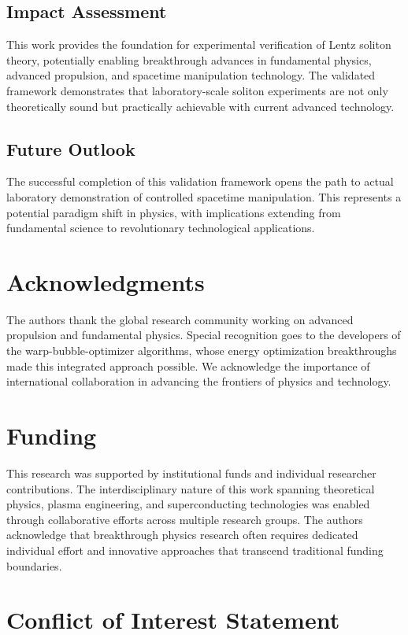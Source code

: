 \documentclass[12pt,a4paper]{article}
\begin{document}
\subsection{Impact Assessment}
This work provides the foundation for experimental verification of Lentz soliton theory, potentially enabling breakthrough advances in fundamental physics, advanced propulsion, and spacetime manipulation technology. The validated framework demonstrates that laboratory-scale soliton experiments are not only theoretically sound but practically achievable with current advanced technology.

\subsection{Future Outlook}
The successful completion of this validation framework opens the path to actual laboratory demonstration of controlled spacetime manipulation. This represents a potential paradigm shift in physics, with implications extending from fundamental science to revolutionary technological applications.

\section*{Acknowledgments}

The authors thank the global research community working on advanced propulsion and fundamental physics. Special recognition goes to the developers of the warp-bubble-optimizer algorithms, whose energy optimization breakthroughs made this integrated approach possible. We acknowledge the importance of international collaboration in advancing the frontiers of physics and technology.

\section*{Funding}

This research was supported by institutional funds and individual researcher contributions. The interdisciplinary nature of this work spanning theoretical physics, plasma engineering, and superconducting technologies was enabled through collaborative efforts across multiple research groups. The authors acknowledge that breakthrough physics research often requires dedicated individual effort and innovative approaches that transcend traditional funding boundaries.

\section*{Conflict of Interest Statement}
\end{document}
